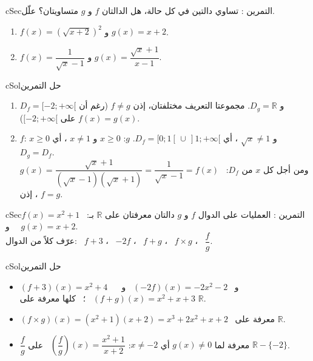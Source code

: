\documentclass[12pt,a4paper]{article}
\newenvironment{BOX}[2]{\begin{otherlanguage}{english}\begin{arbox}{#1}{#2}}{\end{arbox}\end{otherlanguage}}
\newcounter{exo}
\newenvironment{tamrin}[1]{\stepcounter{exo}\begin{BOX}{cSec}{التمرين \theexo: #1}}{\end{BOX}}
\newenvironment{hal}{\Needspace{12\baselineskip}\begin{otherlanguage}{english}\begin{arbox}[breakable]{cSol}{حل التمرين \theexo}}{\end{arbox}\end{otherlanguage}}
\newcommand{\R}{\mathbb{R}}
\begin{document}
\begin{tamrin}{تساوي دالتين}
في كل حالة، هل الدالتان $f$ و $g$ متساويتان؟ علّل.
\begin{enumerate}
\item $f(x)=\left(\sqrt{x+2}\right)^2$ \quad و \quad $g(x)=x+2$.
\item $f(x)=\dfrac{1}{\sqrt x-1}$ \quad و \quad $g(x)=\dfrac{\sqrt x+1}{x-1}$.
\end{enumerate}
\end{tamrin}
\begin{hal}
\begin{enumerate}
\item $D_f=[-2;+\infty[$ و $D_g=\R$. مجموعتا التعريف مختلفتان، إذن $\boxed{f\ne g}$ (رغم أن $f(x)=g(x)$ على $[-2;+\infty[$).
\item $f$: $x\ge0$ و $\sqrt x\ne1$ ، أي $D_f=[0;1[\,\cup\,]1;+\infty[$. \quad $g$: $x\ge0$ و $x\ne1$ ، أي $D_g=D_f$.\\
ومن أجل كل $x$ من $D_f$: \ $g(x)=\dfrac{\sqrt x+1}{\left(\sqrt x-1\right)\left(\sqrt x+1\right)}=\dfrac{1}{\sqrt x-1}=f(x)$ ، إذن $\boxed{f=g}$.
\end{enumerate}
\end{hal}

\begin{tamrin}{العمليات على الدوال}
$f$ و $g$ دالتان معرفتان على $\R$ بـ: \ $f(x)=x^2+1$ \ و \ $g(x)=x+2$.\\
عرّف كلاً من الدوال: \ $f+3$ ، \ $-2f$ ، \ $f+g$ ، \ $f\times g$ ، \ $\dfrac fg$.
\end{tamrin}
\begin{hal}
\begin{itemize}
\item $(f+3)(x)=x^2+4$ \ و \ $(-2f)(x)=-2x^2-2$ \ و \ $(f+g)(x)=x^2+x+3$ \ ؛ \ كلها معرفة على $\R$.
\item $(f\times g)(x)=\left(x^2+1\right)(x+2)=x^3+2x^2+x+2$ \ معرفة على $\R$.
\item $\dfrac fg$ معرفة لما $g(x)\neq0$ أي $x\ne-2$: \quad $\left(\dfrac fg\right)(x)=\dfrac{x^2+1}{x+2}$ \ على $\R-\{-2\}$.
\end{itemize}
\end{hal}

\end{document}
